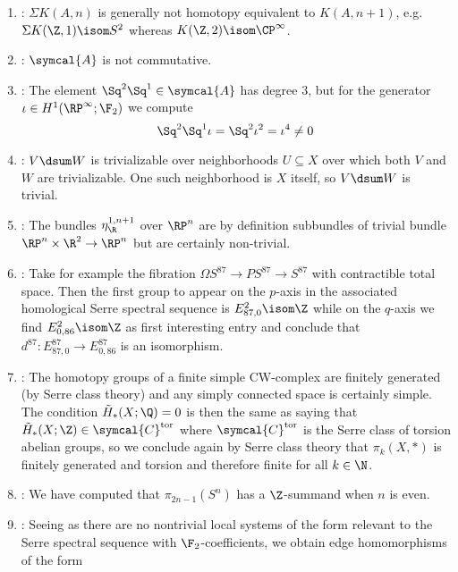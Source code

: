\begin{answers}
	\leavevmode
	\begin{enumerate}
		\item {}: $\Sigma K(A, n)$ is generally not homotopy equivalent to $K(A, n + 1)$, e.g. $\Sigma K(\Z, 1) \isom S^2$ whereas $K(\Z, 2) \isom \CP^\infty$.
		\item {}: $\symcal{A}$ is not commutative.
		\item {}: The element $\Sq^2 \Sq^1 \in \symcal{A}$ has degree 3, but for the generator $\iota \in H^1(\RP^\infty; \F_2)$ we compute
			\begin{equation*}
				\Sq^2 \Sq^1 \iota = \Sq^2 \iota^2 = \iota^4 \neq 0
			\end{equation*}
		\item {}: $V \dsum W$ is trivializable over neighborhoods $U \subseteq X$ over which both $V$ and $W$ are trivializable.
			One such neighborhood is $X$ itself, so $V \dsum W$ is trivial.
		\item {}: The bundles $\eta_\R^{1, n + 1}$ over $\RP^n$ are by definition subbundles of trivial bundle $\RP^n \times \R^2 \to \RP^n$ but are certainly non-trivial.
		\item {}: Take for example the fibration $\Omega S^{87} \to P S^{87} \to S^{87}$ with contractible total space.
			Then the first group to appear on the $p$-axis in the associated homological Serre spectral sequence is $E^2_{87, 0} \isom \Z$ while on the $q$-axis we find $E^2_{0, 86} \isom \Z$ as first interesting entry and conclude that $d^{87}\colon E^{87}_{87, 0} \to E^{87}_{0, 86}$ is an isomorphism.
		\item {}: The homotopy groups of a finite simple CW-complex are finitely generated (by Serre class theory) and any simply connected space is certainly simple.
			The condition $\tilde{H}_*(X; \Q) = 0$ is then the same as saying that $\tilde{H}_*(X; \Z) \in \symcal{C}^\text{tor}$ where $\symcal{C}^\text{tor}$ is the Serre class of torsion abelian groups, so we conclude again by Serre class theory that $\pi_k(X, *)$ is finitely generated and torsion and therefore finite for all $k \in \N$.
		\item {}: We have computed that $\pi_{2n - 1}(S^n)$ has a $\Z$-summand when $n$ is even.
		\item {}: Seeing as there are no nontrivial local systems of the form relevant to the Serre spectral sequence with $\F_2$-coefficients, we obtain edge homomorphisms of the form 

\end{enumerate}
\end{answers}

